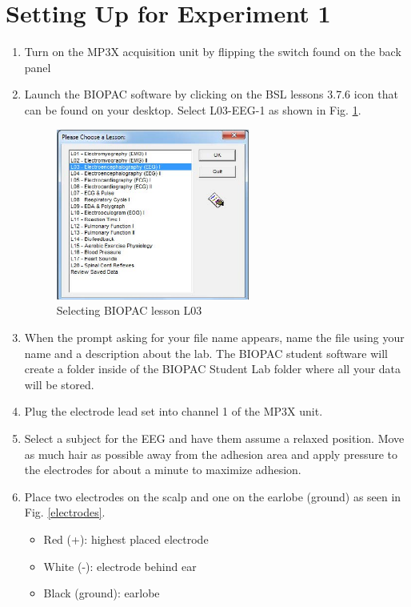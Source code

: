 \documentclass{article}
\begin{document}
\section*{Setting Up for Experiment 1}
\begin{enumerate}
	\item Turn on the MP3X acquisition unit by flipping the switch found on the back panel
	\item Launch the BIOPAC software by clicking on the BSL lessons 3.7.6 icon that can be found on your desktop. Select L03-EEG-1 as shown in Fig. \ref{lesson}.
		\begin{figure}[h]
		\centering
	\includegraphics[width=0.6\textwidth]{../images/EEG_4.jpg}	
		\caption{Selecting BIOPAC lesson L03}
		\label{lesson}
		\end{figure}

	\item When the prompt asking for your file name appears, name the file using your name and a description about the lab. The BIOPAC student software will create a folder inside of the BIOPAC Student Lab folder where all your data will be stored.
	\item Plug the electrode lead set into channel 1 of the MP3X unit.
	\item Select a subject for the EEG and have them assume a relaxed position. Move as much hair as possible away from the adhesion area and apply pressure to the electrodes for about a minute to maximize adhesion.
	\item Place two electrodes on the scalp and one on the earlobe (ground) as seen in Fig. \ref{electrodes}.
		\begin{itemize}
			\item Red (+): highest placed electrode
			\item White (-): electrode behind ear
			\item Black (ground): earlobe
		\end{itemize}
		

\end{enumerate}
\end{document}
